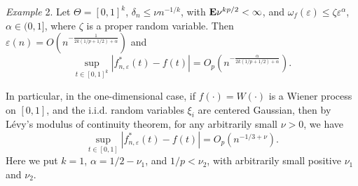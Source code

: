 \documentclass[12pt]{article}
\theoremstyle{remark}
\begin{document}
{\it Example} 2. Let $\Theta=[0,1]^k$, $\delta_n\le \nu n^{-1/k}$, with ${\bf E}\nu^{kp/2}<\infty$, and $\omega_f(\varepsilon)\le \zeta \varepsilon^{\alpha}$, $\alpha\in (0,1]$, where
$\zeta$ is a proper random variable. Then $\varepsilon(n)=O\left(n^{-\frac{1}{2k(1/p+1/2)+\alpha}}\right)$
and
$$\sup_{t\in [0,1]^k}|f^*_{n,\varepsilon}(t)-f(t)|=O_p\left(n^{-\frac{\alpha}{2k(1/p+1/2)+\alpha}}
\right).
$$

In particular, in the one-dimensional case, if $f(\cdot)=W(\cdot)$ is a Wiener process on $[0,1]$, and the i.i.d. random variables $\xi_i$ are centered Gaussian, then
by L\'{e}vy's modulus of continuity theorem,
for any arbitrarily small $\nu>0$, we have
$$\sup_{t\in [0,1]}|f^*_{n,\varepsilon}(t)-f(t)|=O_p(n^{-1/3+\nu}).
$$
Here we put  $k=1$, $\alpha=1/2-\nu_1$, and $1/p<\nu_2$, with arbitrarily small positive $\nu_1$ and $\nu_2$.
\end{document}
